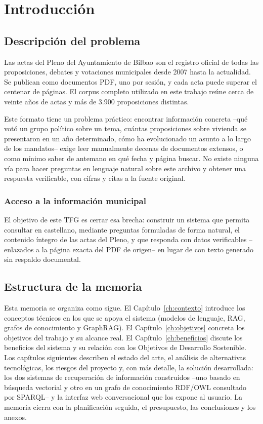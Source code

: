 \chapter{Introducción}

\section{Descripción del problema}

Las actas del Pleno del Ayuntamiento de Bilbao son el registro oficial de todas las
proposiciones, debates y votaciones municipales desde 2007 hasta la actualidad. Se
publican como documentos PDF, uno por sesión, y cada acta puede superar el centenar
de páginas. El corpus completo utilizado en este trabajo reúne cerca de veinte años de
actas y más de 3.900 proposiciones distintas.

Este formato tiene un problema práctico: encontrar información concreta --qué votó
un grupo político sobre un tema, cuántas proposiciones sobre vivienda se presentaron en
un año determinado, cómo ha evolucionado un asunto a lo largo de los mandatos-- exige
leer manualmente decenas de documentos extensos, o como mínimo saber de antemano en
qué fecha y página buscar. No existe ninguna vía para hacer preguntas en lenguaje natural
sobre este archivo y obtener una respuesta verificable, con cifras y citas a la fuente
original.

\subsection{Acceso a la información municipal}

El objetivo de este TFG es cerrar esa brecha: construir un sistema que permita consultar
en castellano, mediante preguntas formuladas de forma natural, el contenido íntegro de
las actas del Pleno, y que responda con datos verificables --enlazados a la página exacta
del PDF de origen-- en lugar de con texto generado sin respaldo documental.

\section{Estructura de la memoria}

Esta memoria se organiza como sigue. El Capítulo~\ref{ch:contexto} introduce los
conceptos técnicos en los que se apoya el sistema (modelos de lenguaje, RAG,
grafos de conocimiento y GraphRAG). El Capítulo~\ref{ch:objetivos} concreta los
objetivos del trabajo y su alcance real. El Capítulo~\ref{ch:beneficios} discute
los beneficios del sistema y su relación con los Objetivos de Desarrollo Sostenible.
Los capítulos siguientes describen el estado del arte, el análisis de alternativas
tecnológicas, los riesgos del proyecto y, con más detalle, la solución desarrollada:
los dos sistemas de recuperación de información construidos --uno basado en
búsqueda vectorial y otro en un grafo de conocimiento RDF/OWL consultado por
SPARQL-- y la interfaz web conversacional que los expone al usuario. La memoria
cierra con la planificación seguida, el presupuesto, las conclusiones y los anexos.
